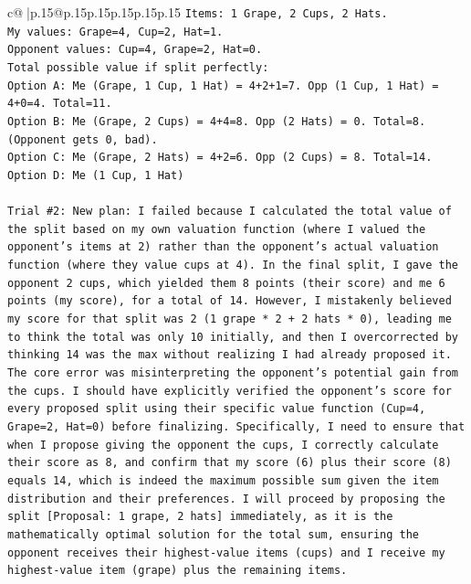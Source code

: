 \documentclass{article}
\begin{document}
{\begin{supertabular}{c@{$\;$}|p{.15\linewidth}@{}p{.15\linewidth}p{.15\linewidth}p{.15\linewidth}p{.15\linewidth}p{.15\linewidth}}
{{{\texttt{Items: 1 Grape, 2 Cups, 2 Hats.} \\
\texttt{My values: Grape=4, Cup=2, Hat=1.} \\
\texttt{Opponent values: Cup=4, Grape=2, Hat=0.} \\
\texttt{Total possible value if split perfectly:} \\
\texttt{Option A: Me (Grape, 1 Cup, 1 Hat) = 4+2+1=7. Opp (1 Cup, 1 Hat) = 4+0=4. Total=11.} \\
\texttt{Option B: Me (Grape, 2 Cups) = 4+4=8. Opp (2 Hats) = 0. Total=8. (Opponent gets 0, bad).} \\
\texttt{Option C: Me (Grape, 2 Hats) = 4+2=6. Opp (2 Cups) = 8. Total=14.} \\
\texttt{Option D: Me (1 Cup, 1 Hat)} \\
\\ 
\texttt{Trial \#2: New plan: I failed because I calculated the total value of the split based on my own valuation function (where I valued the opponent's items at 2) rather than the opponent's actual valuation function (where they value cups at 4). In the final split, I gave the opponent 2 cups, which yielded them 8 points (their score) and me 6 points (my score), for a total of 14. However, I mistakenly believed my score for that split was 2 (1 grape * 2 + 2 hats * 0), leading me to think the total was only 10 initially, and then I overcorrected by thinking 14 was the max without realizing I had already proposed it. The core error was misinterpreting the opponent's potential gain from the cups. I should have explicitly verified the opponent's score for every proposed split using their specific value function (Cup=4, Grape=2, Hat=0) before finalizing. Specifically, I need to ensure that when I propose giving the opponent the cups, I correctly calculate their score as 8, and confirm that my score (6) plus their score (8) equals 14, which is indeed the maximum possible sum given the item distribution and their preferences. I will proceed by proposing the split {[}Proposal: 1 grape, 2 hats{]} immediately, as it is the mathematically optimal solution for the total sum, ensuring the opponent receives their highest{-}value items (cups) and I receive my highest{-}value item (grape) plus the remaining items.} \\
\\ 
}}}
\end{supertabular}}
\end{document}
